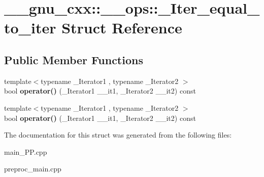 \hypertarget{struct____gnu__cxx_1_1____ops_1_1__Iter__equal__to__iter}{\section{\+\_\+\+\_\+gnu\+\_\+cxx\+:\+:\+\_\+\+\_\+ops\+:\+:\+\_\+\+Iter\+\_\+equal\+\_\+to\+\_\+iter Struct Reference}
\label{struct____gnu__cxx_1_1____ops_1_1__Iter__equal__to__iter}
}
\subsection*{Public Member Functions}
\begin{DoxyCompactItemize}
\item 
\hypertarget{struct____gnu__cxx_1_1____ops_1_1__Iter__equal__to__iter_ab1d7b4a714169c1e1e849c1f29b8c5e2}{{\footnotesize template$<$typename \+\_\+\+Iterator1 , typename \+\_\+\+Iterator2 $>$ }\\bool {\bfseries operator()} (\+\_\+\+Iterator1 \+\_\+\+\_\+it1, \+\_\+\+Iterator2 \+\_\+\+\_\+it2) const }\label{struct____gnu__cxx_1_1____ops_1_1__Iter__equal__to__iter_ab1d7b4a714169c1e1e849c1f29b8c5e2}

\item 
\hypertarget{struct____gnu__cxx_1_1____ops_1_1__Iter__equal__to__iter_ab1d7b4a714169c1e1e849c1f29b8c5e2}{{\footnotesize template$<$typename \+\_\+\+Iterator1 , typename \+\_\+\+Iterator2 $>$ }\\bool {\bfseries operator()} (\+\_\+\+Iterator1 \+\_\+\+\_\+it1, \+\_\+\+Iterator2 \+\_\+\+\_\+it2) const }\label{struct____gnu__cxx_1_1____ops_1_1__Iter__equal__to__iter_ab1d7b4a714169c1e1e849c1f29b8c5e2}

\end{DoxyCompactItemize}


The documentation for this struct was generated from the following files\+:\begin{DoxyCompactItemize}
\item 
main\+\_\+\+P\+P.\+cpp\item 
preproc\+\_\+main.\+cpp\end{DoxyCompactItemize}
